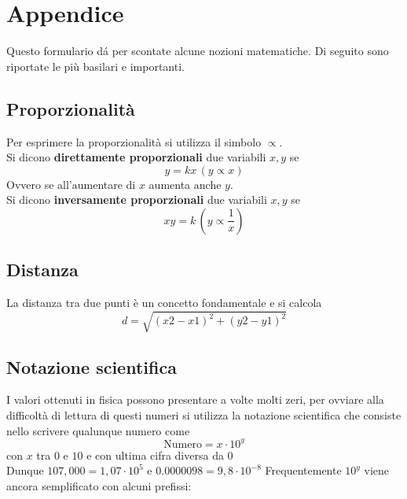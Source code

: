 
\section{Appendice}
Questo formulario dá per scontate alcune nozioni matematiche. Di seguito sono riportate le più
basilari e importanti.

\subsection{Proporzionalità}
Per esprimere la proporzionalità si utilizza il simbolo $\propto$.\\
Si dicono \textbf{direttamente proporzionali} due variabili $x,y$ se
\begin{equation*}
  y = kx\,(y\propto x)
\end{equation*}
Ovvero se all'aumentare di $x$ aumenta anche $y$.\\ [\baselineskip]
Si dicono \textbf{inversamente proporzionali} due variabili $x,y$ se 
\begin{equation*}
  xy = k\,\left(y\propto\frac{1}{x}\right)
\end{equation*}

\subsection{Distanza}

La distanza tra due punti è un concetto fondamentale e si calcola 
\begin{equation*}
  d=\sqrt{(x2-x1)^{2}+(y2-y1)^{2}}
\end{equation*}
\begin{center}     
\end{center}

\subsection{Notazione scientifica}
I valori ottenuti in fisica possono presentare a volte molti zeri, per ovviare alla difficoltà di 
lettura di questi numeri si utilizza la notazione scientifica che consiste nello scrivere qualunque
numero come 
\begin{equation*}
  \text{Numero}=x\cdot 10^{y}
\end{equation*}
con $x$ tra $0$ e $10$ e con ultima cifra diversa da $0$\\
Dunque $107,000=1,07\cdot10^{5}$ e $0.0000098=9,8\cdot10^{-8}$ 
Frequentemente $10^{y}$ viene ancora semplificato con alcuni prefissi:

